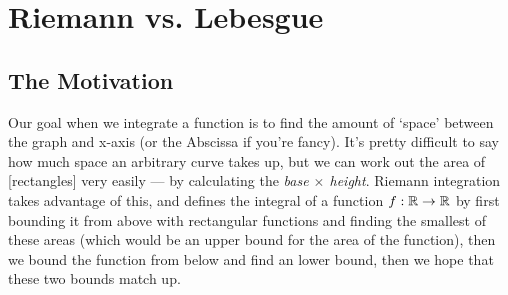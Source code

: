 \section{Riemann vs. Lebesgue}
%
%
\subsection{The Motivation}
Our goal when we integrate a function is to find the amount of `space' between the graph and x-axis (or the Abscissa if you're fancy). It's pretty difficult to say how much space an arbitrary curve takes up, but we can work out the area of [rectangles] very easily --- by calculating the {\em base $\times$ height}. Riemann integration takes advantage of this, and defines the integral of a function $f:\mathbb{R} \rightarrow \mathbb{R}$ by first bounding it from above with rectangular functions and finding the smallest of these areas (which would be an upper bound for the area of the function), then we bound the function from below and find an lower bound, then we hope that these two bounds match up. 

